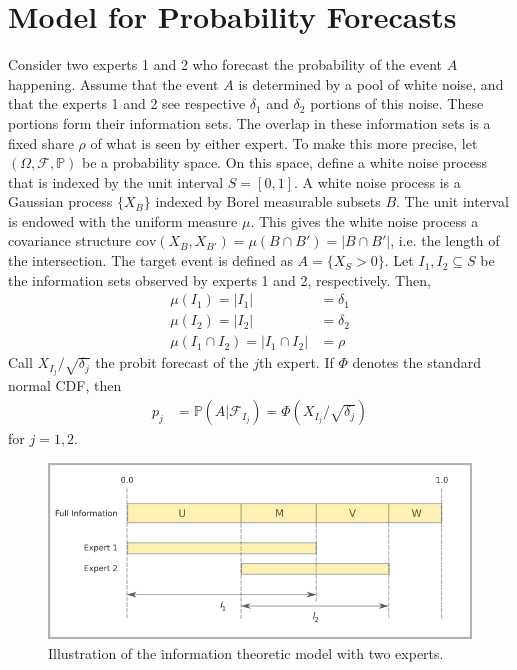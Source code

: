 \documentclass[11pt,twoside]{article}
\renewcommand{\P}{\mathbb{P}}
\begin{document}
\section{Model for Probability Forecasts}
\label{Model}
Consider two experts 1 and 2 who forecast the probability of the event $A$ happening. Assume that the event $A$ is determined by a pool of white noise, and that the experts 1 and 2 see respective $\delta_1$ and $\delta_2$ portions of this noise. These portions form their information sets. The overlap in these information sets is a fixed share $\rho$ of what is seen by either expert. To make this more precise, let $(\Omega, \mathcal{F}, \P)$ be a probability space. On this space, define a white noise process that is indexed by the unit interval $S = [0,1]$. A white noise process is a Gaussian process $\{ X_B \}$ indexed by Borel measurable subsets $B$. The unit interval is endowed with the uniform measure $\mu$. This gives the white noise process a covariance structure $\text{cov}(X_B, X_{B'}) = \mu(B \cap B') = |B \cap B'|$, i.e. the length of the intersection. The target event is defined as $A = \{ X_{S} > 0\}$. Let $I_1, I_2 \subseteq S$ be the information sets observed by experts 1 and 2, respectively. Then,
\begin{align*}
\mu(I_1) = |I_1| &= \delta_1\\
\mu(I_2) = |I_2| &= \delta_2\\
\mu(I_1 \cap I_2) =  |I_1 \cap I_2| &= \rho
\end{align*}
Call $X_{I_j}/\sqrt{\delta_j}$ the probit forecast of the $j$th expert.  If $\Phi$ denotes the standard normal CDF, then
\begin{align*}
p_j &= \P(A | \mathcal{F}_{I_j}) = \Phi\left( X_{I_j} / \sqrt{\delta_j} \right)
\end{align*}
for $j = 1, 2$. 

\begin{figure}[htbp]
   \includegraphics[width = \textwidth]{N=2} %
   \caption{Illustration of the information theoretic model with two experts.}
   \label{diagram2}
\end{figure}
\end{document}
